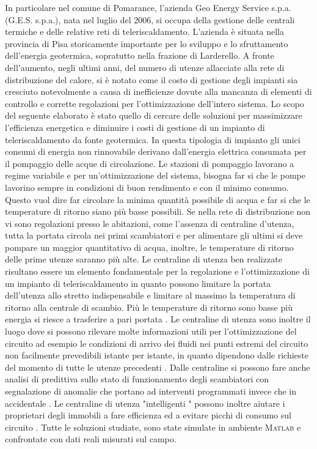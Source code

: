 \documentclass[laurea,oneside,11pt]{USiena_tesiLM}
\begin{document}
In particolare nel comune di Pomarance, l'azienda Geo Energy Service s.p.a. (G.E.S. s.p.a.), nata nel luglio del 2006, si occupa della gestione delle centrali termiche e delle relative reti di teleriscaldamento. L'azienda è situata nella provincia di Pisa storicamente importante per lo sviluppo e lo sfruttamento dell'energia geotermica, sopratutto nella frazione di Larderello.
A fronte dell'aumento, negli ultimi anni, del numero di utenze allacciate alla rete di distribuzione del calore, si è notato come il costo di gestione degli impianti sia cresciuto notevolmente a causa di inefficienze dovute alla mancanza di elementi di controllo e corrette regolazioni per l'ottimizzazione dell'intero sistema.
Lo scopo del seguente elaborato è stato quello di cercare delle soluzioni per massimizzare l'efficienza energetica e diminuire i costi di gestione di un impianto di teleriscaldamento da fonte geotermica. In questa tipologia di impianto gli unici consumi di energia non rinnovabile  derivano dall'energia elettrica consumata  per il pompaggio delle acque di circolazione. 
Le stazioni di pompaggio lavorano a regime variabile e per un'ottimizzazione del sistema, bisogna far si che le pompe lavorino sempre in condizioni di buon rendimento e con il minimo consumo. Questo vuol dire far circolare la minima quantità possibile di acqua e far si che le temperature di ritorno siano più basse possibili. Se nella rete di distribuzione non vi sono regolazioni presso le abitazioni, come l'assenza di centraline d'utenza, tutta la portata circola nei primi scambiatori e per alimentare gli ultimi si deve pompare un maggior quantitativo di acqua, inoltre, le temperature di ritorno delle prime utenze saranno più alte. Le centraline di utenza ben realizzate risultano essere un elemento fondamentale per la regolazione e l'ottimizzazione di un impianto di teleriscaldamento in quanto possono  limitare la portata dell'utenza allo stretto indispensabile e limitare al massimo la temperatura di ritorno alla centrale di scambio. Più le temperature di ritorno sono basse più energia si riesce a trasferire a pari portata . Le centraline di utenza sono inoltre il luogo dove si possono rilevare molte informazioni utili per l'ottimizzazione del circuito ad esempio le condizioni di arrivo dei fluidi nei punti estremi del circuito non facilmente prevedibili istante per istante, in quanto dipendono dalle richieste del momento di tutte le utenze precedenti .
Dalle centraline si possono fare anche analisi di predittiva sullo stato di funzionamento degli scambiatori con segnalazione di anomalie che portano ad interventi programmati invece che in accidentale .
Le centraline di utenza "intelligenti " possono inoltre aiutare i proprietari degli immobili a fare efficienza ed a evitare picchi di consumo sul circuito .
Tutte le soluzioni studiate, sono state simulate in ambiente \textsc{Matlab} e confrontate con dati reali misurati sul campo.
\end{document}
